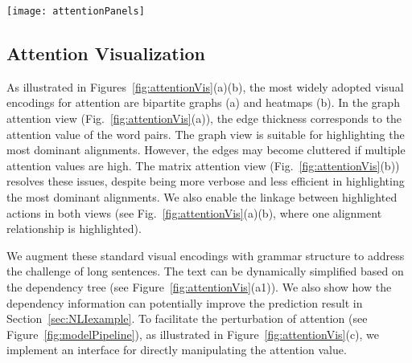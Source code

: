\begin{figure*}[t]
\centering
\vspace{-2mm}
 \texttt{[image: attentionPanels]}
  \vspace{-3mm}
 \caption{
Attention visualization. A bipartite graph encoding is adopted in the graph attention view (a), in which the edge thickness corresponds to the attention value. The same attention values can also be directly visualized in the matrix form (b).
The user can edit the attention values via the pop-up interface illustrated in (c).
We overlay the dependency tree ($a_1$) grammar structure to highlight important words and allow simplification of complex sentences (shown in the video).
%
For highly asymmetric attention, we utilized a zoomable hierarchical visual representation (d). The user can focus on the individual sentence by selecting the summary visualization.
}
\vspace{-3mm}
\label{fig:attentionVis}
\end{figure*}

\subsection{Attention Visualization}
As illustrated in Figures~\ref{fig:attentionVis}(a)(b), the most widely adopted visual encodings for attention are  bipartite graphs (a) and heatmaps (b). 
%
In the graph attention view (Fig.~\ref{fig:attentionVis}(a)), the edge thickness corresponds to the attention value of the word pairs. %
The graph view is suitable for highlighting the most dominant alignments. However, the edges may become cluttered if multiple attention values are high. 
The matrix attention view (Fig.~\ref{fig:attentionVis}(b)) resolves these issues, despite being more verbose and less efficient in highlighting the most dominant alignments. 
We also enable the linkage between highlighted actions in both views (see Fig.~\ref{fig:attentionVis}(a)(b), where one alignment relationship is highlighted).

We augment these standard visual encodings with grammar structure to address the challenge of long sentences.
The text can be dynamically simplified based on the dependency tree (see Figure~\ref{fig:attentionVis}(a1)). We also show how the dependency information can potentially improve the prediction result in Section~\ref{sec:NLIexample}.
%
To facilitate the perturbation of attention (see Figure~\ref{fig:modelPipeline}), as illustrated in Figure~\ref{fig:attentionVis}(c), we implement an interface for directly manipulating the attention value.

